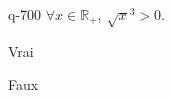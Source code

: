 \begin{truefalse}{q-700}
$\forall x \in \mathbb R_+,\: \sqrt x^3>0$.
\item Vrai
\item* Faux
\end{truefalse}

